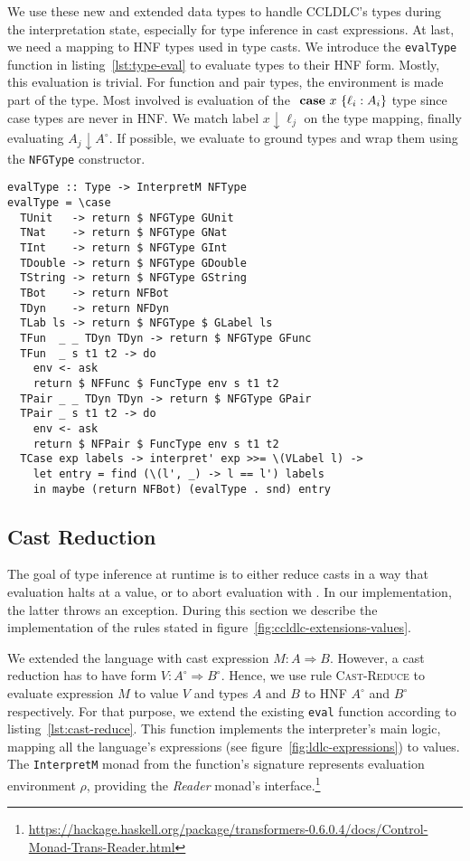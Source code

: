 We use these new and extended data types to handle CCLDLC's types during the interpretation state, especially for type inference in cast expressions. At last, we need a mapping to HNF types used in type casts. We introduce the \texttt{evalType} function in listing~\ref{lst:type-eval} to evaluate types to their HNF form. Mostly, this evaluation is trivial. For function and pair types, the environment is made part of the type. Most involved is evaluation of the $\text{ \textbf{case} } x~\{\ell_i : A_i\}$ type since case types are never in HNF. We match label $x \downarrow \ell_j$ on the type mapping, finally evaluating $A_j \downarrow A^\circ$. If possible, we evaluate to ground types and wrap them using the \texttt{NFGType} constructor.

\begin{lstlisting}[float,
  caption=Haskell: Type evaluation (\texttt{Interpreter.hs}),
  label=lst:type-eval]
evalType :: Type -> InterpretM NFType
evalType = \case
  TUnit   -> return $ NFGType GUnit
  TNat    -> return $ NFGType GNat
  TInt    -> return $ NFGType GInt
  TDouble -> return $ NFGType GDouble
  TString -> return $ NFGType GString
  TBot    -> return NFBot
  TDyn    -> return NFDyn
  TLab ls -> return $ NFGType $ GLabel ls
  TFun  _ _ TDyn TDyn -> return $ NFGType GFunc
  TFun  _ s t1 t2 -> do
    env <- ask
    return $ NFFunc $ FuncType env s t1 t2
  TPair _ _ TDyn TDyn -> return $ NFGType GPair
  TPair _ s t1 t2 -> do
    env <- ask
    return $ NFPair $ FuncType env s t1 t2
  TCase exp labels -> interpret' exp >>= \(VLabel l) ->
    let entry = find (\(l', _) -> l == l') labels
    in maybe (return NFBot) (evalType . snd) entry
\end{lstlisting}

\subsection{Cast Reduction}

The goal of type inference at runtime is to either reduce casts in a way that evaluation halts at a value, or to abort evaluation with \blame. In our implementation, the latter throws an exception. During this section we describe the implementation of the rules stated in figure~\ref{fig:ccldlc-extensions-values}.

We extended the language with cast expression $M : A \Rightarrow B$. However, a cast reduction has to have form $V : A^\circ \Rightarrow B^\circ$. Hence, we use rule \textsc{Cast-Reduce} to evaluate expression $M$ to value $V$ and types $A$ and $B$ to HNF $A^\circ$ and $B^\circ$ respectively. For that purpose, we extend the existing \texttt{eval} function according to listing~\ref{lst:cast-reduce}. This function implements the interpreter's main logic, mapping all the language's expressions (see figure~\ref{fig:ldlc-expressions}) to values. The \texttt{InterpretM} monad from the function's signature represents evaluation environment $\rho$, providing the \emph{Reader} monad's interface.\footnote{\url{https://hackage.haskell.org/package/transformers-0.6.0.4/docs/Control-Monad-Trans-Reader.html}}

